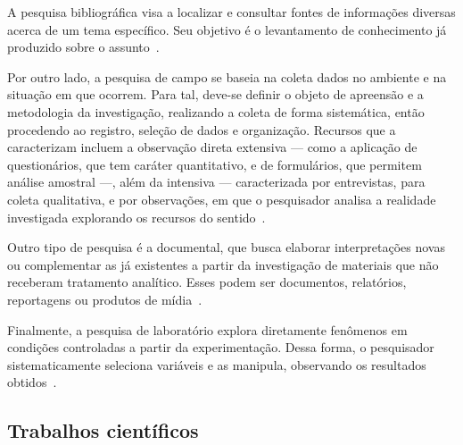 A pesquisa bibliográfica visa a localizar e consultar fontes de informações diversas acerca de um tema específico.
Seu objetivo é o levantamento de conhecimento já produzido sobre o assunto~\cite{liamara_pesquisa}.

Por outro lado, a pesquisa de campo se baseia na coleta dados no ambiente e na situação em que ocorrem.
Para tal, deve-se definir o objeto de apreensão e a metodologia da investigação, realizando a coleta de forma sistemática, então procedendo ao registro, seleção de dados e organização.
Recursos que a caracterizam incluem a observação direta extensiva --- como a aplicação de questionários, que tem caráter quantitativo, e de formulários, que permitem análise amostral ---, além da intensiva --- caracterizada por entrevistas, para coleta qualitativa, e por observações, em que o pesquisador analisa a realidade investigada explorando os recursos do sentido~\cite{liamara_pesquisa}.

Outro tipo de pesquisa é a documental, que busca elaborar interpretações novas ou complementar as já existentes a partir da investigação de materiais que não receberam tratamento analítico.
Esses podem ser documentos, relatórios, reportagens ou produtos de mídia~\cite{liamara_pesquisa}.

Finalmente, a pesquisa de laboratório explora diretamente fenômenos em condições controladas a partir da experimentação.
Dessa forma, o pesquisador sistematicamente seleciona variáveis e as manipula, observando os resultados obtidos~\cite{liamara_pesquisa}.


\subsection{Trabalhos científicos}